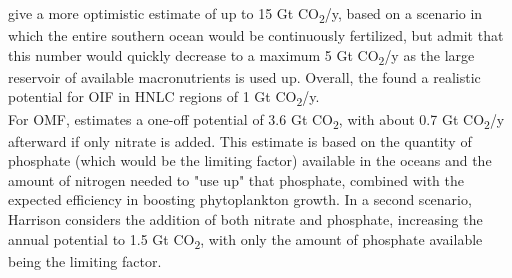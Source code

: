 \textcite{Keller2014PotentialScenario} give a more optimistic estimate of up to 15 Gt CO\textsubscript{2}/y, based on a scenario in which the entire southern ocean would be continuously fertilized, but admit that this number would quickly decrease to a maximum 5 Gt CO\textsubscript{2}/y as the large reservoir of available macronutrients is used up.
Overall, the \textcite[87]{NAS2022ASequestration} found a realistic potential for OIF in HNLC regions of 1 Gt CO\textsubscript{2}/y.\\
For OMF, \textcite{Harrison2017GlobalFertilization} estimates a one-off potential of 3.6 Gt CO\textsubscript{2}, with about 0.7 Gt CO\textsubscript{2}/y afterward if only nitrate is added. This estimate is based on the quantity of phosphate (which would be the limiting factor) available in the oceans and the amount of nitrogen needed to "use up" that phosphate, combined with the expected efficiency in boosting phytoplankton growth. In a second scenario, Harrison considers the addition of both nitrate and phosphate, increasing the annual potential to 1.5 Gt CO\textsubscript{2}, with only the amount of phosphate available being the limiting factor.
